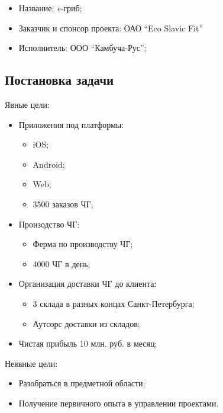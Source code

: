 \documentclass[a4paper,10pt]{article}
\begin{document}
    \begin{itemize}
        \item Название: \textit{e}-гриб;
        \item Заказчик и спонсор проекта: ОАО ``Eco Slavic Fit''
        \item Исполнитель: ООО ``Камбуча-Рус'';
    \end{itemize}

\subsection{Постановка задачи}


Явные цели:

    \begin{itemize}
        \item Приложения под платформы:
            \begin{itemize}
                \item iOS;
                \item Android;
                \item Web;
                \item 3500 заказов ЧГ;
            \end{itemize}
        \item Произодство ЧГ:
            \begin{itemize}
                \item Ферма по производству ЧГ;
                \item 4000 ЧГ в день;
            \end{itemize}
        \item Организация доставки ЧГ до клиента:
            \begin{itemize}
                \item 3 склада в разных концах Санкт-Петербурга;
                \item Аутсорс доставки из складов;
            \end{itemize}
        \item Чистая прибыль 10 млн. руб. в месяц;
    \end{itemize}

Неявные цели:

    \begin{itemize}
        \item Разобраться в предметной области;
        \item Получение первичного опыта в управлении проектами.
    \end{itemize}
\end{document}
